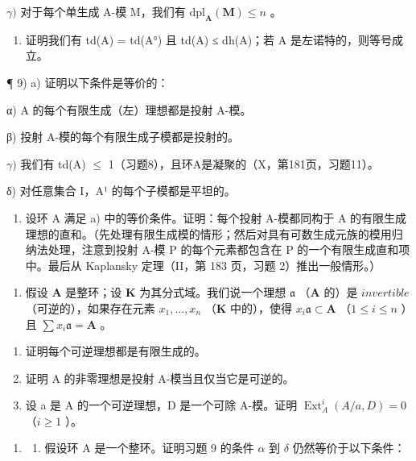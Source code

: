 \(\gamma)\) 对于每个单生成 A-模 M，我们有 \(\mathrm{dpl}_{\mathbf{A}}(\mathbf{M}) \leqslant n\) 。

\begin{enumerate}
\def\labelenumi{\alph{enumi})}
\setcounter{enumi}{1}
\tightlist
\item
  证明我们有 td(A) = td(A°) 且 td(A) ≤ dh(A)；若 A 是左诺特的，则等号成立。
\end{enumerate}

¶ 9) a) 证明以下条件是等价的：

α) A 的每个有限生成（左）理想都是投射 A-模。

β) 投射 A-模的每个有限生成子模都是投射的。

\(\gamma)\) 我们有 td(A) \(\leqslant\) 1（习题8），且环A是凝聚的（X，第181页，习题11）。

δ) 对任意集合 I，A¹ 的每个子模都是平坦的。

\begin{enumerate}
\def\labelenumi{\alph{enumi})}
\setcounter{enumi}{1}
\tightlist
\item
  设环 A 满足 a) 中的等价条件。证明：每个投射 A-模都同构于 A 的有限生成理想的直和。（先处理有限生成模的情形；然后对具有可数生成元族的模用归纳法处理，注意到投射 A-模 P 的每个元素都包含在 P 的一个有限生成直和项中。最后从 Kaplansky 定理（II，第 183 页，习题 2）推出一般情形。）
\end{enumerate}

\begin{enumerate}
\def\labelenumi{\arabic{enumi})}
\setcounter{enumi}{9}
\tightlist
\item
  假设 \(\mathbf{A}\) 是整环；设 \(\mathbf{K}\) 为其分式域。我们说一个理想 \(\mathfrak{a}\) （\(\mathbf{A}\) 的）是 \(invertible\) （可逆的），如果存在元素 \(x_{1},\ldots ,x_{n}\) （\(\mathbf{K}\) 中的），使得 \(x_{i}\mathfrak{a}\subset \mathbf{A}\) （\(1\leqslant i\leqslant n\) ）且 \(\sum x_i\mathfrak{a} = \mathbf{A}\) 。
\end{enumerate}

\begin{enumerate}
\def\labelenumi{\alph{enumi})}
\item
  证明每个可逆理想都是有限生成的。
\item
  证明 A 的非零理想是投射 A-模当且仅当它是可逆的。
\item
  设 a 是 A 的一个可逆理想，D 是一个可除 A-模。证明 \(\operatorname{Ext}_A^i(A/a, D) = 0\) （\(i \geqslant 1\) ）。
\end{enumerate}

\begin{enumerate}
\def\labelenumi{\arabic{enumi})}
\setcounter{enumi}{10}
\tightlist
\item
  \begin{enumerate}
  \def\labelenumii{\alph{enumii})}
  \tightlist
  \item
    假设环 A 是一个整环。证明习题 9 的条件 \(\alpha\) 到 \(\delta\) 仍然等价于以下条件：
  \end{enumerate}
\end{enumerate}

